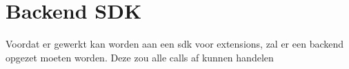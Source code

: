 \chapter{Backend SDK}

Voordat er gewerkt kan worden aan een sdk voor extensions, zal er een backend opgezet moeten worden. Deze zou alle calls af kunnen handelen